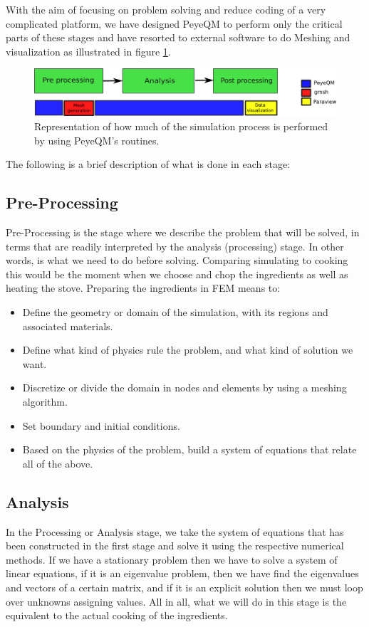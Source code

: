 With the aim of focusing on problem solving and reduce coding of a very complicated platform, we have designed PeyeQM to perform only the critical parts of these stages and have resorted to external software to do Meshing and visualization as illustrated in figure \ref{fig:stages_comp}. 
%
\begin{figure}
\centering
\includegraphics[scale=.3]{./img/stages_comparison.pdf}
\caption{Representation of how much of the simulation process is performed by using PeyeQM's routines.}
\label{fig:stages_comp}
\end{figure}  
%
The following is a brief description of what is done in each stage:

\subsection{Pre-Processing}
Pre-Processing is the stage where we describe the problem that will be solved, in terms that are readily interpreted by the analysis (processing) stage. In other words, is what we need to do before solving. Comparing simulating to cooking this would be the moment when we choose and chop the ingredients as well as heating the stove. Preparing the ingredients in FEM means to:
\begin{itemize}
\item Define the geometry or domain of the simulation, with its regions and associated materials.
\item Define what kind of physics rule the problem, and what kind of solution we want.
\item Discretize or divide the domain in nodes and elements by using a meshing algorithm. 
\item Set boundary and initial conditions.
\item Based on the physics of the problem, build a system of equations that relate all of the above.
\end{itemize} 
 
\subsection{Analysis}
In the Processing or Analysis stage, we take the system of equations that has been constructed in the first stage and solve it using the respective numerical methods. If we have a stationary problem then  we have to solve a system of linear equations, if it is an eigenvalue problem, then we have find the eigenvalues and vectors of a certain matrix, and if it is an explicit solution then we must loop over unknowns assigning values. All in all, what we will do in this stage is the equivalent to the actual cooking of the ingredients. 

